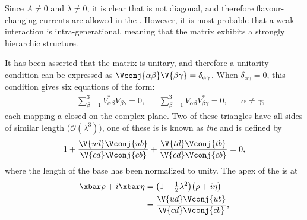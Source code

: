 Since $A\neq0$ and $\lambda\neq0$, it is clear that \VCKM is not diagonal, and therefore
flavour-changing currents are allowed in the \sm.
However,
it is most probable that a weak interaction is intra-generational, meaning that
the \ckm matrix exhibits a strongly hierarchic structure.


It has been asserted that the \ckm matrix is unitary, and therefore a
unitarity condition can be expressed as
$\Vconj{\alpha\beta}\V{\beta\gamma}=\delta_{\alpha\gamma}$.
When $\delta_{\alpha\gamma}=0$, this condition gives six equations of the form:
\begin{align}
  \phantom{\beta\neq\gamma}
  &&\sum_{\beta=1}^3V_{\alpha\beta}^*V_{\beta\gamma}^{\phantom{*}} = 0,
  &&\sum_{\beta=1}^3V_{\alpha\beta}^{\phantom{*}}V_{\beta\gamma}^*=0,
  &&\alpha\neq\gamma;
  \label{eq:th:offdiag}
\end{align}
each mapping a closed  on the complex plane.
Two of these triangles have all sides of similar length
$\big(\mathcal{O}(\lambda^3)\big)$,
one of these is
is known as \emph{the} \ut and is defined by
\begin{equation}
  1 + \frac{\V{ud}\Vconj{ub}}{\V{cd}\Vconj{cb}} + \frac{\V{td}\Vconj{tb}}{\V{cd}\Vconj{cb}} = 0,
  \label{eq:th:ut}
\end{equation}
where the length of the base has been normalized to unity.
The apex of the \ut is at
\begin{align}
  \xbar\rho+i\xbar\eta &= \big(1-\tfrac12\lambda^2\big)\big(\rho+i\eta\big)
  \nonumber\\
  &=\frac{\V{ud}\Vconj{ub}}{\V{cd}\Vconj{cb}},
\end{align}
